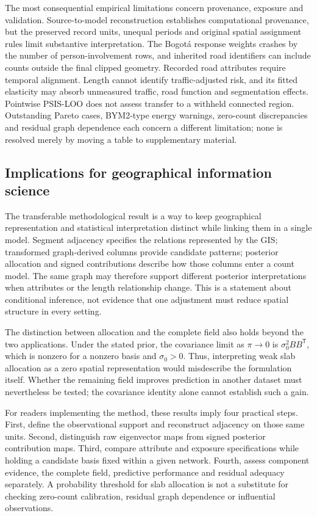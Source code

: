 \documentclass[11pt]{article}
\begin{document}
The most consequential empirical limitations concern provenance, exposure and validation. Source-to-model reconstruction establishes computational provenance, but the preserved record units, unequal periods and original spatial assignment rules limit substantive interpretation. The Bogot\'a response weights crashes by the number of person-involvement rows, and inherited road identifiers can include counts outside the final clipped geometry. Recorded road attributes require temporal alignment. Length cannot identify traffic-adjusted risk, and its fitted elasticity may absorb unmeasured traffic, road function and segmentation effects. Pointwise PSIS-LOO does not assess transfer to a withheld connected region. Outstanding Pareto cases, BYM2-type energy warnings, zero-count discrepancies and residual graph dependence each concern a different limitation; none is resolved merely by moving a table to supplementary material.

\subsection{Implications for geographical information science}
\label{sec:gis_implications}
The transferable methodological result is a way to keep geographical representation and statistical interpretation distinct while linking them in a single model. Segment adjacency specifies the relations represented by the GIS; transformed graph-derived columns provide candidate patterns; posterior allocation and signed contributions describe how those columns enter a count model. The same graph may therefore support different posterior interpretations when attributes or the length relationship change. This is a statement about conditional inference, not evidence that one adjustment must reduce spatial structure in every setting.

The distinction between allocation and the complete field also holds beyond the two applications. Under the stated prior, the covariance limit as $\pi\to0$ is $\sigma_0^2BB^{\mathsf T}$, which is nonzero for a nonzero basis and $\sigma_0>0$. Thus, interpreting weak slab allocation as a zero spatial representation would misdescribe the formulation itself. Whether the remaining field improves prediction in another dataset must nevertheless be tested; the covariance identity alone cannot establish such a gain.

For readers implementing the method, these results imply four practical steps. First, define the observational support and reconstruct adjacency on those same units. Second, distinguish raw eigenvector maps from signed posterior contribution maps. Third, compare attribute and exposure specifications while holding a candidate basis fixed within a given network. Fourth, assess component evidence, the complete field, predictive performance and residual adequacy separately. A probability threshold for slab allocation is not a substitute for checking zero-count calibration, residual graph dependence or influential observations.
\end{document}
